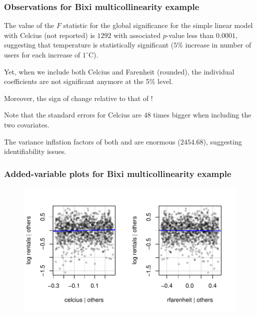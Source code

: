 \documentclass{beamer}
\begin{document}
\begin{frame}
 \frametitle{Observations for Bixi multicollinearity example}
 \bi 
 \item The value of the $F$ statistic for the global significance for the simple linear model with Celcius (not reported) is $1292$ with associated $p$-value less than $0.0001$, suggesting that temperature is statistically significant ($5$\% increase in number of users for each increase of $1^{\circ}$C).
 \item Yet, when we include both Celcius and Farenheit (rounded), the individual coefficients are not significant anymore at the 5\% level.
 \item Moreover, the sign of  change relative to that of !
  \item Note that the standard errors for Celcius are $48$ times bigger when including the two covariates.
 \item The variance inflation factors of both  and  are enormous ($2454.68$), suggesting identifiability issues. 
\ei
\end{frame}
\begin{frame}[fragile]
 \frametitle{Added-variable plots for Bixi multicollinearity example}
 
 \begin{figure}
  \centering 
  \includegraphics[width = \textwidth]{img/c2/03-linreg-avplot_temp.pdf}
 \end{figure}

\end{frame}
\end{document}
